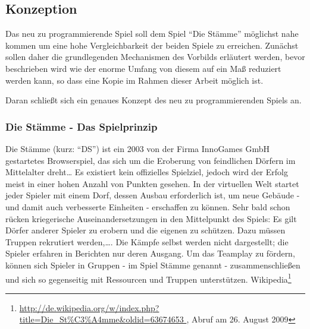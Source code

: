 \documentclass[10pt]{scrartcl}
\begin{document}
  \subsection{Konzeption}
  Das neu zu programmierende Spiel soll dem Spiel ``Die Stämme'' möglichst nahe kommen um eine hohe Vergleichbarkeit der beiden Spiele zu erreichen. Zunächst sollen daher die grundlegenden Mechanismen des Vorbilds erläutert werden, bevor beschrieben wird wie der enorme Umfang von diesem auf ein Maß reduziert werden kann, so dass eine Kopie im Rahmen dieser Arbeit möglich ist.
  
  Daran schließt sich ein genaues Konzept des neu zu programmierenden Spiels an.
  
  \subsubsection{Die Stämme - Das Spielprinzip}
  {
    Die Stämme (kurz: ``DS'') ist ein 2003 von der Firma InnoGames GmbH gestartetes Browserspiel, das sich um die Eroberung von feindlichen Dörfern im Mittelalter dreht\ldots
    Es existiert kein offizielles Spielziel, jedoch wird der Erfolg meist in einer hohen Anzahl von Punkten gesehen. In der virtuellen Welt startet jeder Spieler mit einem Dorf, dessen Ausbau erforderlich ist, um neue Gebäude - und damit auch verbesserte Einheiten - erschaffen zu können. Sehr bald schon rücken kriegerische Auseinandersetzungen in den Mittelpunkt des Spiels: Es gilt Dörfer anderer Spieler zu erobern und die eigenen zu schützen. Dazu müssen Truppen rekrutiert werden,\ldots . Die Kämpfe selbst werden nicht dargestellt; die Spieler erfahren in Berichten nur deren Ausgang. Um das Teamplay zu fördern, können sich Spieler in Gruppen - im Spiel Stämme genannt - zusammenschließen und sich so gegenseitig mit Ressourcen und Truppen unterstützen.
  }
  {
    Wikipedia\footnote{
 \url{http://de.wikipedia.org/w/index.php?title=Die_St\%C3\%A4mme&oldid=63674653
    }, Abruf am 26. August 2009}
  }{}
  
\end{document}
